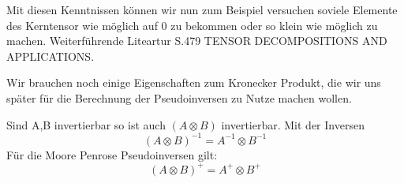 Mit diesen Kenntnissen können wir nun zum Beispiel versuchen soviele Elemente des Kerntensor wie möglich auf 0 zu bekommen oder so klein wie möglich zu machen.
Weiterführende Liteartur S.479 TENSOR DECOMPOSITIONS AND APPLICATIONS.

Wir brauchen noch einige Eigenschaften zum Kronecker Produkt, die wir uns später für die Berechnung der Pseudoinversen zu Nutze machen wollen.

\begin{Lemma}
Sind A,B invertierbar so ist auch $(A \otimes B)$ invertierbar. Mit der Inversen
\begin{equation*}
(A \otimes B)^{-1} = A^{-1} \otimes B^{-1}
\end{equation*}
Für die Moore Penrose Pseudoinversen gilt:
\begin{equation*}
(A \otimes B)^{+} = A^{+} \otimes B^{+}
\end{equation*}
\end{Lemma}

